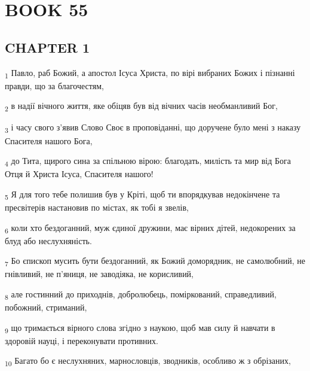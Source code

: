 \section{BOOK 55}
\subsection{CHAPTER 1}
\begin{tcolorbox}
\textsubscript{1} Павло, раб Божий, а апостол Ісуса Христа, по вірі вибраних Божих і пізнанні правди, що за благочестям,
\end{tcolorbox}
\begin{tcolorbox}
\textsubscript{2} в надії вічного життя, яке обіцяв був від вічних часів необманливий Бог,
\end{tcolorbox}
\begin{tcolorbox}
\textsubscript{3} і часу свого з'явив Слово Своє в проповіданні, що доручене було мені з наказу Спасителя нашого Бога,
\end{tcolorbox}
\begin{tcolorbox}
\textsubscript{4} до Тита, щирого сина за спільною вірою: благодать, милість та мир від Бога Отця й Христа Ісуса, Спасителя нашого!
\end{tcolorbox}
\begin{tcolorbox}
\textsubscript{5} Я для того тебе полишив був у Кріті, щоб ти впорядкував недокінчене та пресвітерів настановив по містах, як тобі я звелів,
\end{tcolorbox}
\begin{tcolorbox}
\textsubscript{6} коли хто бездоганний, муж єдиної дружини, має вірних дітей, недокорених за блуд або неслухняність.
\end{tcolorbox}
\begin{tcolorbox}
\textsubscript{7} Бо єпископ мусить бути бездоганний, як Божий доморядник, не самолюбний, не гнівливий, не п'яниця, не заводіяка, не корисливий,
\end{tcolorbox}
\begin{tcolorbox}
\textsubscript{8} але гостинний до приходнів, добролюбець, поміркований, справедливий, побожний, стриманий,
\end{tcolorbox}
\begin{tcolorbox}
\textsubscript{9} що тримається вірного слова згідно з наукою, щоб мав силу й навчати в здоровій науці, і переконувати противних.
\end{tcolorbox}
\begin{tcolorbox}
\textsubscript{10} Багато бо є неслухняних, марнословців, зводників, особливо ж з обрізаних,
\end{tcolorbox}
